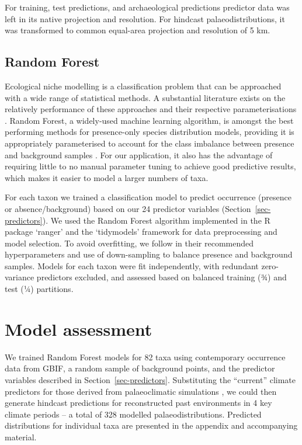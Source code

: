 \documentclass[
  authoryear,
  preprint]{elsarticle}
\begin{document}
For training, test predictions, and archaeological predictions predictor
data was left in its native projection and resolution. For hindcast
palaeodistributions, it was transformed to common equal-area projection
and resolution of 5 km.

\subsection{Random Forest}\label{random-forest}

Ecological niche modelling is a classification problem that can be
approached with a wide range of statistical methods. A substantial
literature exists on the relatively performance of these approaches and
their respective parameterisations \citep[reviewed
in][]{ValaviEtAl2022}. Random Forest, a widely-used machine learning
algorithm, is amongst the best performing methods for presence-only
species distribution models, providing it is appropriately parameterised
to account for the class imbalance between presence and background
samples \citep{ValaviEtAl2021, ValaviEtAl2022}. For our application, it
also has the advantage of requiring little to no manual parameter tuning
to achieve good predictive results, which makes it easier to model a
larger numbers of taxa.

For each taxon we trained a classification model to predict occurrence
(presence or absence/background) based on our 24 predictor variables
(Section~\ref{sec-predictors}). We used the Random Forest algorithm
implemented in the R package `ranger' \citep{WrightZiegler2017} and the
`tidymodels' \citep{tidymodels} framework for data preprocessing and
model selection. To avoid overfitting, we follow \citet{ValaviEtAl2021}
in their recommended hyperparameters and use of down-sampling to balance
presence and background samples. Models for each taxon were fit
independently, with redundant zero-variance predictors excluded, and
assessed based on balanced training (¾) and test (¼) partitions.

\section{Model assessment}\label{model-assessment}

We trained Random Forest models for 82 taxa using contemporary
occurrence data from GBIF, a random sample of background points, and the
predictor variables described in Section~\ref{sec-predictors}.
Substituting the ``current'' climate predictors for those derived from
palaeoclimatic simulations \citep{BrownEtAl2018}, we could then generate
hindcast predictions for reconstructed past environments in 4 key
climate periods -- a total of 328 modelled palaeodistributions.
Predicted distributions for individual taxa are presented in the
appendix and accompanying material.
\end{document}

